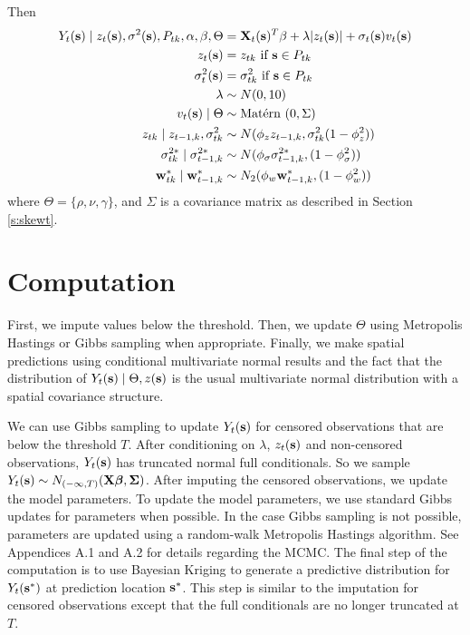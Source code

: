 \documentclass[11pt]{article}
\begin{document}
Then
\begin{align}
   Y_t(\mbox{\bf s}) \mid z_{t}(\mbox{\bf s}), \sigma^2(\mbox{\bf s}), P_{tk}, \alpha, \beta, \Theta &= \mbox{\bf X}_t(\mbox{\bf s})^T \beta + \lambda |z_t(\mbox{\bf s})| + \sigma_t(\mbox{\bf s}) v_t(\mbox{\bf s}) \label{eq:hier}\\
   z_t(\mbox{\bf s}) &= z_{tk} \text{ if } \mbox{\bf s} \in P_{tk}\\
   \sigma^2_{t}(\mbox{\bf s}) &= \sigma^2_{tk} \text{ if } \mbox{\bf s} \in P_{tk}\\
   \lambda &\sim N(0, 10)\\
   v_t(\mbox{\bf s}) \mid \Theta &\sim \mbox{Mat$\acute{\mbox{e}}$rn }(0, \Sigma)\\
   z_{tk} \mid z_{t-1, k}, \sigma^2_{tk} &\sim N(\phi_z z_{t-1, k}, \sigma^2_{tk} (1 - \phi_z^2))\\
   \sigma^{2*}_{tk} \mid \sigma^{2*}_{t-1, k} &\sim N(\phi_\sigma \sigma^{2*}_{t-1, k}, (1 - \phi_\sigma^2))\\
   \mbox{\bf w}^*_{tk} \mid \mbox{\bf w}^*_{t-1, k} &\sim N_2(\phi_w \mbox{\bf w}^*_{t-1, k}, (1 - \phi_w^2))
\end{align}
where $\Theta = \{\rho, \nu, \gamma\}$, and $\Sigma$ is a \Matern covariance matrix as described in Section \ref{s:skewt}.

\section{Computation}\label{s:comp}
First, we impute values below the threshold.
Then, we update $\Theta$ using Metropolis Hastings or Gibbs sampling when appropriate.
Finally, we make spatial predictions using conditional multivariate normal results and the fact that the distribution of $Y_t(\mbox{\bf s}) \mid \Theta, z(\mbox{\bf s})$ is the usual multivariate normal distribution with a \Matern spatial covariance structure.

We can use Gibbs sampling to update $Y_t(\mbox{\bf s})$ for censored observations that are below the threshold $T$.
After conditioning on $\lambda$, $z_t(\mbox{\bf s})$ and non-censored observations, $Y_t(\mbox{\bf s})$ has truncated normal full conditionals.
So we sample $Y_t(\mbox{\bf s}) \sim N_{(-\infty, T)}(\mbox{\bf X} \mbox{\boldmath $\beta$}, \mbox{\boldmath $\Sigma$})$.
After imputing the censored observations, we update the model parameters.
To update the model parameters, we use standard Gibbs updates for parameters when possible.
In the case Gibbs sampling is not possible, parameters are updated using a random-walk Metropolis Hastings algorithm.
See Appendices A.1 and A.2 for details regarding the MCMC.
The final step of the computation is to use Bayesian Kriging to generate a predictive distribution for $Y_t(\mbox{\bf s}^*)$ at prediction location $\mbox{\bf s}^*$.
This step is similar to the imputation for censored observations except that the full conditionals are no longer truncated at $T$.
\end{document}
